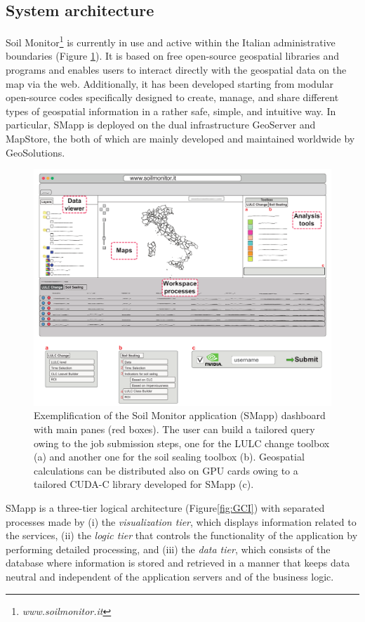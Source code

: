 \documentclass[APA,LATO1COL,doublespace]{WileyNJD-v2}
\begin{document}
\subsection{System architecture}
Soil Monitor\footnote{\emph{www.soilmonitor.it}} is currently in use and active within the Italian administrative boundaries (Figure \ref{fig:SMapp}).
It is based on free open-source geospatial libraries and programs and enables users to interact directly with the geospatial data on the map via the web.
Additionally, it has been developed starting from modular open-source codes specifically designed to create, manage, and share different types of geospatial information in a rather safe, simple, and intuitive way.
In particular, SMapp is deployed on the dual infrastructure GeoServer and MapStore, the both of which are mainly developed and maintained worldwide by GeoSolutions.

\begin{figure}[t]
    \centerline{\includegraphics[width=500pt]{Figure01.pdf}}
    \caption{Exemplification of the Soil Monitor application (SMapp) dashboard with main panes (red boxes). 
    The user can build a tailored query owing to the job submission steps, one for the LULC change toolbox (a) and another one for the soil sealing toolbox (b). 
    Geospatial calculations can be distributed also on GPU cards owing to a tailored CUDA-C library developed for SMapp (c). } \label{fig:SMapp}
\end{figure}

SMapp is a three-tier logical architecture (Figure\ref{fig:GCI}) with separated processes made by (i) the \textit{visualization tier}, which displays information related to the services, (ii) the \textit{logic tier} that controls the functionality of the application by performing detailed processing, and (iii) the \textit{data tier}, which consists of the database where information is stored and retrieved in a manner that keeps data neutral and independent of the application servers and of the business logic.
\end{document}
